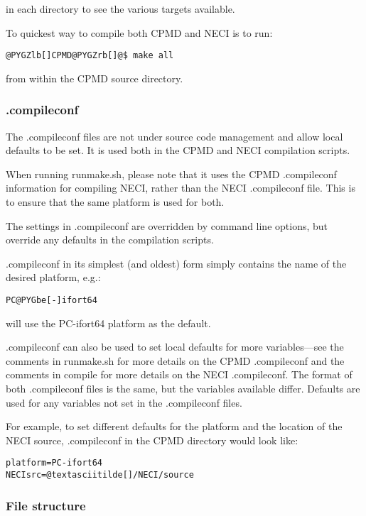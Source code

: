 \documentclass[openany,a4paper,10pt,english]{manual}
\begin{document}
in each directory to see the various targets available.

To quickest way to compile both CPMD and NECI is to run:

\begin{Verbatim}[commandchars=@\[\]]
@PYGZlb[]CPMD@PYGZrb[]@$ make all
\end{Verbatim}

from within the CPMD source directory.


\subsubsection{.compileconf}

The .compileconf files are not under source code management and allow local defaults
to be set.  It is used both in the CPMD and NECI compilation scripts.

When running runmake.sh, please note that it uses the CPMD .compileconf information
for compiling NECI, rather than the NECI .compileconf file.  This is to ensure that
the same platform is used for both.

The settings in .compileconf are overridden by command line options, but override
any defaults in the compilation scripts.

.compileconf in its simplest (and oldest) form simply contains the name of the desired
platform, e.g.:

\begin{Verbatim}[commandchars=@\[\]]
PC@PYGbe[-]ifort64
\end{Verbatim}

will use the PC-ifort64 platform as the default.

.compileconf can also be used to set local defaults for more
variables---see the comments in runmake.sh for more details on the CPMD
.compileconf and the comments in compile for more details on the NECI
.compileconf.  The format of both .compileconf files is the same, but the
variables available differ.  Defaults are used for any variables not set
in the .compileconf files.

For example, to set different defaults for the platform
and the location of the NECI source, .compileconf in the CPMD directory
would look like:

\begin{Verbatim}[commandchars=@\[\]]
platform=PC-ifort64
NECIsrc=@textasciitilde[]/NECI/source
\end{Verbatim}


\subsubsection{File structure}
\end{document}
